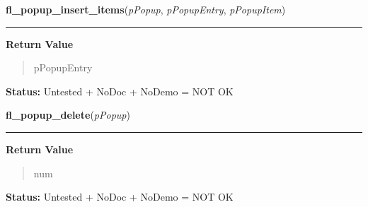     \vspace{0.5ex}

\hspace{.8\funcindent}\begin{boxedminipage}{\funcwidth}

    \raggedright \textbf{fl\_popup\_insert\_items}(\textit{pPopup}, \textit{pPopupEntry}, \textit{pPopupItem})

    \vspace{-1.5ex}

    \rule{\textwidth}{0.5\fboxrule}
\setlength{\parskip}{2ex}
\setlength{\parskip}{1ex}
      \textbf{Return Value}
    \vspace{-1ex}

      \begin{quote}
      pPopupEntry

      \end{quote}

\textbf{Status:} Untested + NoDoc + NoDemo = NOT OK



    \end{boxedminipage}

    \label{xformslib:flpopup:fl_popup_delete}

    \vspace{0.5ex}

\hspace{.8\funcindent}\begin{boxedminipage}{\funcwidth}

    \raggedright \textbf{fl\_popup\_delete}(\textit{pPopup})

    \vspace{-1.5ex}

    \rule{\textwidth}{0.5\fboxrule}
\setlength{\parskip}{2ex}
\setlength{\parskip}{1ex}
      \textbf{Return Value}
    \vspace{-1ex}

      \begin{quote}
      num

      \end{quote}

\textbf{Status:} Untested + NoDoc + NoDemo = NOT OK



    \end{boxedminipage}

    \label{xformslib:flpopup:fl_popup_entry_delete}

